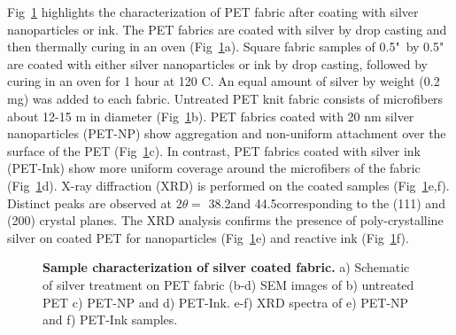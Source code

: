 \documentclass[10pt,letterpaper]{article}
\begin{document}
Fig~\ref{fig1} highlights the characterization of PET fabric after coating with silver nanoparticles or ink.  
The PET fabrics are coated with silver by drop casting and then thermally curing in an oven %
(Fig~\ref{fig1}a).  Square fabric samples of 
0.5"~by 0.5" are coated with either silver nanoparticles or ink by drop casting, followed by curing in an oven for 1 hour at 120 \degree C. An equal amount of silver by weight (0.2 mg) was added to each fabric. 
Untreated PET knit fabric consists of microfibers about 12-15 \micro m in diameter (Fig~\ref{fig1}b). %
PET fabrics coated with 20 nm silver nanoparticles (PET-NP) show aggregation and non-uniform attachment over the surface of the PET (Fig~\ref{fig1}c).  
In contrast, PET fabrics %
coated with silver ink (PET-Ink) 
show more uniform coverage around the microfibers of the fabric (Fig~\ref{fig1}d). 
X-ray diffraction (XRD) is performed on the coated samples (Fig~\ref{fig1}e,f). %
Distinct peaks are observed at 2$\theta =$ 38.2\degree and 44.5\degree corresponding to the (111) and (200) crystal planes. 
The XRD analysis confirms the presence of poly-crystalline silver on coated PET for nanoparticles (Fig~\ref{fig1}e) and reactive ink (Fig~\ref{fig1}f). 

\begin{figure}[!h]
\caption{{\bf Sample characterization of silver coated fabric.}
a) Schematic of silver treatment on PET fabric (b-d) SEM images of b) untreated PET c) PET-NP and d) PET-Ink. e-f) XRD spectra of e) PET-NP and f) PET-Ink samples.}
\label{fig1}
\end{figure}

\end{document}
